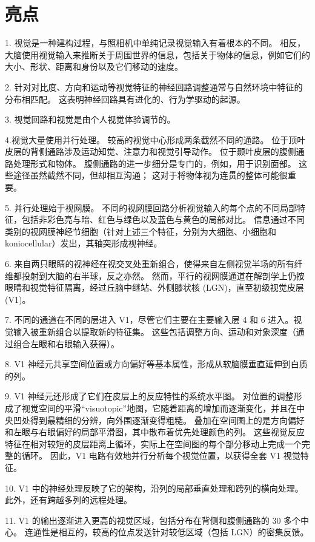 \section{亮点}

1. 视觉是一种建构过程，与照相机中单纯记录视觉输入有着根本的不同。 相反，大脑使用视觉输入来推断关于周围世界的信息，包括关于物体的信息，例如它们的大小、形状、距离和身份以及它们移动的速度。 

2. 针对对比度、方向和运动等视觉特征的神经回路调整通常与自然环境中特征的分布相匹配。 这表明神经回路具有进化的、行为学驱动的起源。 

3. 视觉回路和视觉是由个人视觉体验调节的。 

4.视觉大量使用并行处理。 较高的视觉中心形成两条截然不同的通路。 位于顶叶皮层的背侧通路涉及运动知觉、注意力和视觉引导动作。 位于颞叶皮层的腹侧通路处理形式和物体。 腹侧通路的进一步细分是专门的，例如，用于识别面部。 这些途径虽然截然不同，但却相互沟通； 这对于将物体视为连贯的整体可能很重要。 

5. 并行处理始于视网膜。 不同的视网膜回路分析视觉输入的每个点的不同局部特征，包括非彩色亮与暗、红色与绿色以及蓝色与黄色的局部对比。 信息通过不同类别的视网膜神经节细胞（针对上述三个特征，分别为大细胞、小细胞和 koniocellular）发出，其轴突形成视神经。 

6. 来自两只眼睛的视神经在视交叉处重新组合，使得来自左侧视觉半场的所有纤维都投射到大脑的右半球，反之亦然。 然而，平行的视网膜通道在解剖学上仍按眼睛和视觉特征隔离，经过丘脑中继站、外侧膝状核 (LGN)，直至初级视觉皮层 (V1)。 

7. 不同的通道在不同的层进入 V1，尽管它们主要在主要输入层 4 和 6 进入。视觉输入被重新组合以提取新的特征集。 这些包括调整方向、运动和对象深度（通过组合左眼和右眼输入获得）。 

8. V1 神经元共享空间位置或方向偏好等基本属性，形成从软脑膜垂直延伸到白质的列。 

9. V1 神经元还形成了它们在皮层上的反应特性的系统水平图。 对位置的调整形成了视觉空间的平滑“visuotopic”地图，它随着距离的增加而逐渐变化，并且在中央凹处得到最精细的分辨，向外围逐渐变得粗糙。 叠加在空间图上的是方向偏好和左眼与右眼偏好的局部平滑图，其中散布着优先处理颜色的列。 这些视觉反应特征在相对较短的皮层距离上循环，实际上在空间图的每个部分移动上完成一个完整的循环。 因此，V1 电路有效地并行分析每个视觉位置，以获得全套 V1 视觉特征。 

10. V1 中的神经处理反映了它的架构，沿列的局部垂直处理和跨列的横向处理。 此外，还有跨越多列的远程处理。 

11. V1 的输出逐渐进入更高的视觉区域，包括分布在背侧和腹侧通路的 30 多个中心。 连通性是相互的，较高的位点发送针对较低区域（包括 LGN）的密集反馈。 

